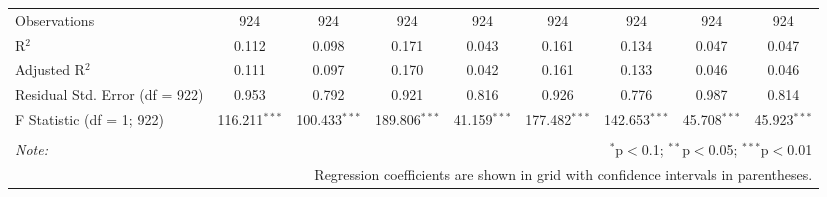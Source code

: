 \begin{table}[!htbp]
\begin{tabular}{@{\extracolsep{1pt}}lcccccccc}
Observations & 924 & 924 & 924 & 924 & 924 & 924 & 924 & 924 \\ 
R$^{2}$ & 0.112 & 0.098 & 0.171 & 0.043 & 0.161 & 0.134 & 0.047 & 0.047 \\ 
Adjusted R$^{2}$ & 0.111 & 0.097 & 0.170 & 0.042 & 0.161 & 0.133 & 0.046 & 0.046 \\ 
Residual Std. Error (df = 922) & 0.953 & 0.792 & 0.921 & 0.816 & 0.926 & 0.776 & 0.987 & 0.814 \\ 
F Statistic (df = 1; 922) & 116.211$^{***}$ & 100.433$^{***}$ & 189.806$^{***}$ & 41.159$^{***}$ & 177.482$^{***}$ & 142.653$^{***}$ & 45.708$^{***}$ & 45.923$^{***}$ \\ 
\hline 
\hline \\[-1.8ex] 
\textit{Note:}  & \multicolumn{8}{r}{$^{*}$p$<$0.1; $^{**}$p$<$0.05; $^{***}$p$<$0.01} \\ 
 & \multicolumn{8}{r}{Regression coefficients are shown in grid with confidence intervals in parentheses.} \\ 
\end{tabular} 
\end{table} 
